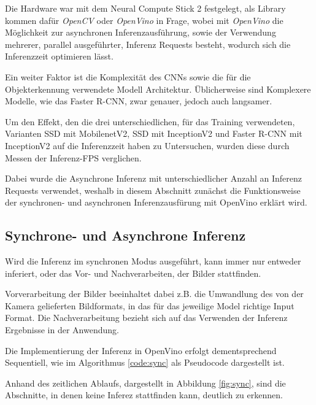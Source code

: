 Die Hardware war mit dem Neural Compute Stick 2 festgelegt, als 
Library kommen dafür \textit{OpenCV} oder \textit{OpenVino}
in Frage, wobei mit \textit{OpenVino} die Möglichkeit 
zur asynchronen Inferenzausführung, sowie der Verwendung mehrerer,
parallel ausgeführter, Inferenz Requests besteht,
wodurch sich die Inferenzzeit optimieren lässt.

Ein weiter Faktor ist die Komplexität des CNNs sowie die 
für die Objekterkennung verwendete Modell Architektur.
Üblicherweise sind Komplexere Modelle, wie das Faster R-CNN,
zwar genauer, jedoch auch langsamer.

Um den Effekt, den die drei unterschiedlichen, 
für das Training verwendeten, Varianten SSD mit MobilenetV2, 
SSD mit InceptionV2 und Faster R-CNN mit InceptionV2 auf die
Inferenzzeit haben zu Untersuchen,
wurden diese durch Messen der Inferenz-FPS verglichen.

Dabei wurde die Asynchrone Inferenz mit unterschiedlicher Anzahl 
an Inferenz Requests verwendet, weshalb in diesem Abschnitt 
zunächst die Funktionsweise der synchronen- und asynchronen
Inferenzausfürung mit OpenVino erklärt wird.


\subsection{Synchrone- und Asynchrone Inferenz}

Wird die Inferenz im synchronen Modus ausgeführt, kann immer
nur entweder inferiert, oder das Vor- und 
Nachverarbeiten, der Bilder stattfinden.

Vorverarbeitung der Bilder beeinhaltet dabei
z.B. die Umwandlung des von der Kamera gelieferten 
Bildformats, in das für das jeweilige Model richtige 
Input Format.
Die Nachverarbeitung bezieht sich auf das Verwenden 
der Inferenz Ergebnisse in der Anwendung.

Die Implementierung der Inferenz in OpenVino erfolgt
dementsprechend Sequentiell, wie im Algorithmus
\ref{code:sync} als Pseudocode dargestellt ist.

Anhand des zeitlichen Ablaufs, dargestellt in Abbildung
\ref{fig:sync}, sind die Abschnitte, in denen
keine Inferez stattfinden kann, deutlich zu erkennen.

